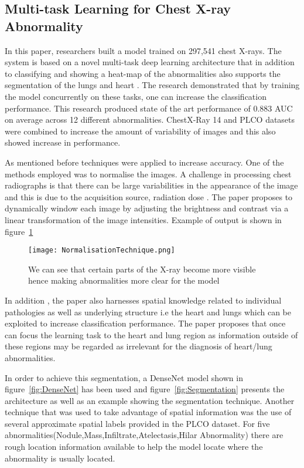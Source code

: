 \setcounter{secnumdepth}{4}
\subsection{Multi-task Learning for Chest X-ray Abnormality}
In this paper, researchers built a model trained on 297,541 chest X-rays. The system is based on a novel multi-task deep learning architecture that in addition to classifying and showing a heat-map of the abnormalities also supports the segmentation of the lungs and heart \cite{guendel2019multi}. The research demonstrated that by training the model concurrently on these tasks, one can increase the classification performance. This research produced state of the art performance of 0.883 AUC on average across 12 different abnormalities. ChestX-Ray 14 \cite{wang2017chestx} and PLCO datasets were combined to increase the amount of variability of images and this also showed increase in performance. 

As mentioned before techniques were applied to increase accuracy. One of the methods employed was to normalise the images. A challenge in processing chest radiographs is that there can be large variabilities in the appearance of the image and this is due to the acquisition source, radiation dose \cite{guendel2019multi}. The paper proposes to dynamically window each image by adjusting the brightness and contrast via a linear transformation of the image intensities. Example of output is shown in figure~\ref{fig:Normalisation} 


\begin{figure}[H]
	\centering
	\texttt{[image: NormalisationTechnique.png]}
	\caption{We can see that certain parts of the X-ray become more visible hence making abnormalities more clear for the model}
	\label{fig:Normalisation}
\end{figure}

In addition , the paper also harnesses spatial knowledge related to individual pathologies as well as underlying structure i.e the heart and lungs which can be exploited to increase classification performance. The paper proposes that once can focus the learning task to the heart and lung region as information outside of these regions may be regarded as irrelevant for the diagnosis of heart/lung abnormalities. 

In order to achieve this segmentation, a DenseNet model shown in figure~\ref{fig:DenseNet} \cite{huang2017densely} has been used and figure~\ref{fig:Segmentation}  presents the architecture as well as an example showing the segmentation technique. Another technique that was used to take advantage of spatial information was the use of several approximate spatial labels provided in the PLCO dataset. For five abnormalities(Nodule,Mass,Infiltrate,Atelectasis,Hilar Abnormality) there are rough location information available  to help the model locate where the abnormality is usually located.



